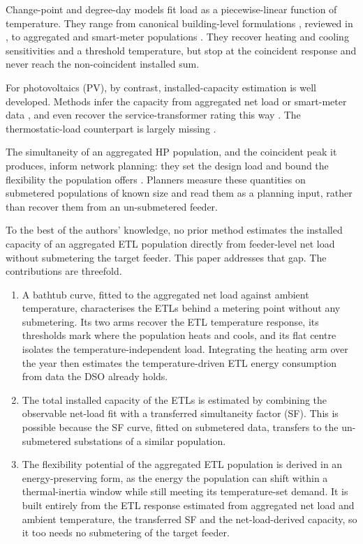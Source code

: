 \documentclass[9pt,journal,a4]{IEEEtran}
\begin{document}
Change-point and degree-day models fit load as a piecewise-linear function of temperature. They range from canonical building-level formulations \cite{Fel08, Ruc92, Kis04}, reviewed in \cite{Faz16}, to aggregated and smart-meter populations \cite{Ali11, Per17b, Mac19}. They recover heating and cooling sensitivities and a threshold temperature, but stop at the coincident response and never reach the non-coincident installed sum.

For photovoltaics (PV), by contrast, installed-capacity estimation is well developed. Methods infer the capacity from aggregated net load or smart-meter data \cite{Was21, Liu22, Gou25, gouveia2026pvcapacity}, and even recover the service-transformer rating this way \cite{Azz24}. The thermostatic-load counterpart is largely missing \cite{Gou26}.

The simultaneity of an aggregated HP population, and the coincident peak it produces, inform network planning: they set the design load \cite{Lov17, Che21b, And20, Rou23} and bound the flexibility the population offers \cite{Mul19, Zir19}. Planners measure these quantities on submetered populations of known size and read them as a planning input, rather than recover them from an un-submetered feeder.

To the best of the authors' knowledge, no prior method estimates the installed capacity of an aggregated ETL population directly from feeder-level net load without submetering the target feeder. This paper addresses that gap. The contributions are threefold.
\begin{enumerate}
\item A bathtub curve, fitted to the aggregated net load against ambient temperature, characterises the ETLs behind a metering point without any submetering. Its two arms recover the ETL temperature response, its thresholds mark where the population heats and cools, and its flat centre isolates the temperature-independent load. Integrating the heating arm over the year then estimates the temperature-driven ETL energy consumption from data the DSO already holds.
\item The total installed capacity of the ETLs is estimated by combining the observable net-load fit with a transferred simultaneity factor (SF). This is possible because the SF curve, fitted on submetered data, transfers to the un-submetered substations of a similar population.
\item The flexibility potential of the aggregated ETL population is derived in an energy-preserving form, as the energy the population can shift within a thermal-inertia window while still meeting its temperature-set demand. It is built entirely from the ETL response estimated from aggregated net load and ambient temperature, the transferred SF and the net-load-derived capacity, so it too needs no submetering of the target feeder.
\end{enumerate}
\end{document}
